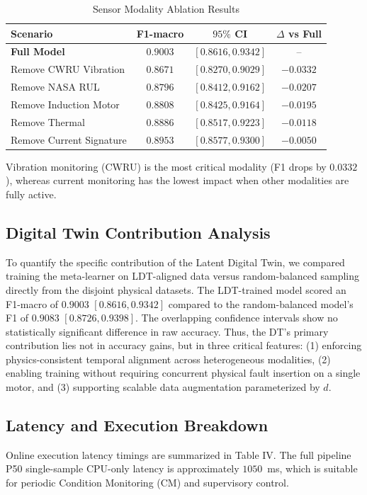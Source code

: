 \documentclass[journal]{IEEEtran}
\begin{document}
\begin{table}[h]
\renewcommand{\arraystretch}{1.2}
\caption{Sensor Modality Ablation Results}
\label{table_ablation}
\centering
\begin{tabular}{lccc}
\toprule
Scenario & F1-macro & $95\%$ CI & $\Delta$ vs Full \\
\midrule
\textbf{Full Model} & $\mathbf{0.9003}$ & $\mathbf{[0.8616, 0.9342]}$ & -- \\
Remove CWRU Vibration & $0.8671$ & $[0.8270, 0.9029]$ & $-0.0332$ \\
Remove NASA RUL & $0.8796$ & $[0.8412, 0.9162]$ & $-0.0207$ \\
Remove Induction Motor & $0.8808$ & $[0.8425, 0.9164]$ & $-0.0195$ \\
Remove Thermal & $0.8886$ & $[0.8517, 0.9223]$ & $-0.0118$ \\
Remove Current Signature & $0.8953$ & $[0.8577, 0.9300]$ & $-0.0050$ \\
\bottomrule
\end{tabular}
\end{table}

Vibration monitoring (CWRU) is the most critical modality (F1 drops by $0.0332$), whereas current monitoring has the lowest impact when other modalities are fully active.

\subsection{Digital Twin Contribution Analysis}
To quantify the specific contribution of the Latent Digital Twin, we compared training the meta-learner on LDT-aligned data versus random-balanced sampling directly from the disjoint physical datasets. 
The LDT-trained model scored an F1-macro of $0.9003$ $[0.8616, 0.9342]$ compared to the random-balanced model's F1 of $0.9083$ $[0.8726, 0.9398]$. The overlapping confidence intervals show no statistically significant difference in raw accuracy. 
Thus, the DT's primary contribution lies not in accuracy gains, but in three critical features: (1) enforcing physics-consistent temporal alignment across heterogeneous modalities, (2) enabling training without requiring concurrent physical fault insertion on a single motor, and (3) supporting scalable data augmentation parameterized by $d$.

\subsection{Latency and Execution Breakdown}
Online execution latency timings are summarized in Table IV. The full pipeline P50 single-sample CPU-only latency is approximately $1050$~ms, which is suitable for periodic Condition Monitoring (CM) and supervisory control.
\end{document}
